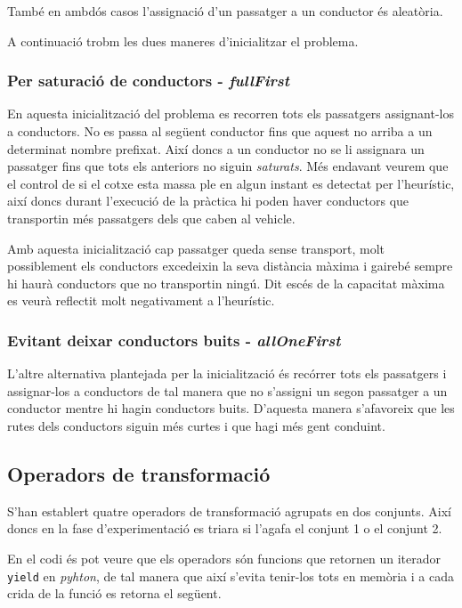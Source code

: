 També en ambdós casos l'assignació d'un passatger a un conductor és aleatòria.

A continuació trobm les dues maneres d'inicialitzar el problema.

\subsubsection{Per saturació de conductors - \emph{fullFirst}}
En aquesta inicialització del problema es recorren tots els passatgers assignant-los a conductors. No es passa
al següent conductor fins que aquest no arriba a un determinat nombre prefixat. Així doncs a un conductor no se
li assignara un passatger fins que tots els anteriors no siguin \emph{saturats}. Més endavant veurem
que el control de si el cotxe esta massa ple en algun instant es detectat per l'heurístic, així doncs
durant l'execució de la pràctica hi poden haver conductors que transportin més passatgers dels que
caben al vehicle.

Amb aquesta inicialització cap passatger queda sense transport, molt possiblement els conductors excedeixin
la seva distància màxima i gairebé sempre hi haurà conductors que no transportin ningú.
Dit escés de la capacitat màxima es veurà reflectit molt negativament a l'heurístic.

\subsubsection{Evitant deixar conductors buits - \emph{allOneFirst}}
L'altre alternativa plantejada per la inicialització és recórrer tots els passatgers i assignar-los a conductors
de tal manera que no s'assigni un segon passatger a un conductor mentre hi hagin conductors buits.
D'aquesta manera s'afavoreix que les rutes dels conductors siguin més curtes i que hagi més
gent conduint.

\subsection{Operadors de transformació}
S'han establert quatre operadors de transformació agrupats en dos conjunts. Així doncs en la fase d'experimentació
es triara si l'agafa el conjunt 1 o el conjunt 2.

En el codi és pot veure que els operadors són funcions que retornen un iterador \texttt{yield} en \emph{pyhton},
de tal manera que així s'evita tenir-los tots en memòria i a cada crida de la funció es retorna el següent.

